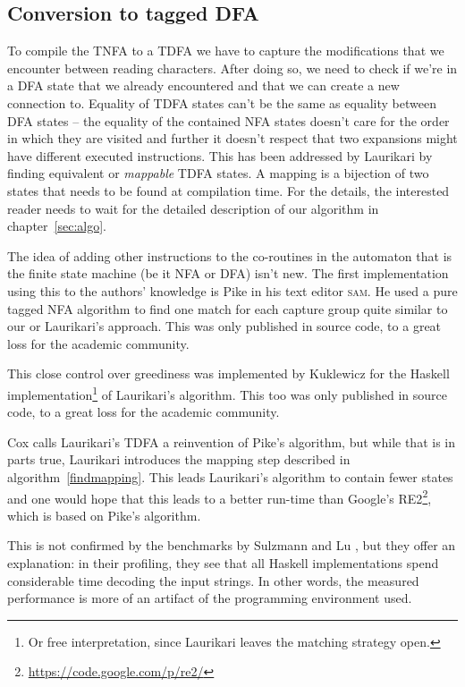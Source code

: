 \documentclass[11pt,a4paper,twoside,openright]{Thesis}
\theoremstyle{definition}
\begin{document}
\subsection{Conversion to tagged DFA}

To compile the TNFA to a TDFA we have to capture the modifications that we 
encounter between reading characters. After doing so, we need to check if 
we're in a DFA state that we already encountered and that we can create a new 
connection to. Equality of TDFA states can't be the same as equality between 
DFA states -- the equality of the contained NFA states doesn't care for the 
order in which they are visited and further it doesn't respect that two 
expansions might have different executed instructions. This has been addressed
by Laurikari\cite{Laur00a} by finding equivalent or \emph{mappable} TDFA
states. A mapping is a bijection of two states that needs to be found at
compilation time. For the details, the interested reader needs to wait for the
detailed description of our algorithm in chapter~\ref{sec:algo}.

The idea of adding other instructions to the co-routines in the automaton
that is the finite state machine (be it NFA or DFA) isn't new. The first
implementation using this to the authors' knowledge is Pike\cite{Pike87a} in
his text editor \textsc{sam}. He used a pure tagged NFA algorithm to find one
match for each capture group quite similar to our or Laurikari's approach. This
was only published in source code, to a great loss for the academic community.

This close control over greediness was implemented by Kuklewicz\cite{Kukl07a}
for the Haskell implementation\footnote{Or free interpretation, since Laurikari
leaves the matching strategy open.} of Laurikari's algorithm. This too was only
published in source code, to a great loss for the academic community.

Cox calls Laurikari's TDFA a reinvention of Pike's algorithm, but while that 
is in parts true, Laurikari introduces the mapping step described in 
algorithm~\ref{findmapping}. This leads Laurikari's algorithm to contain 
fewer states and one would hope that this leads to a better run-time than 
Google's \textsc{RE2}\footnote{\url{https://code.google.com/p/re2/}},
which is based on Pike's algorithm. 

This is not confirmed by the benchmarks by Sulzmann and Lu
\cite{Sulz12a}, but they offer an explanation: in their profiling, they see
that all Haskell implementations spend considerable time decoding the input
strings. In other words, the measured performance is more of an artifact of the
programming environment used.
\end{document}
